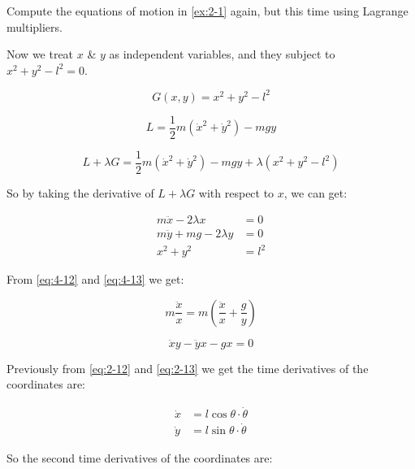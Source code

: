 \begin{example}
    Compute the equations of motion in \ref{ex:2-1} again, but this time using Lagrange multipliers.
\end{example}

Now we treat $x$ \& $y$ as independent variables, and they subject to $x^2+y^2-l^2=0$.
    
\begin{equation}
    G\left(x, y\right) = x^2 + y^2 - l^2
\end{equation}

\begin{equation}
    L = \frac{1}{2} m \left(\dot{x} ^ 2 + \dot{y} ^ 2\right) - mgy
\end{equation}

\begin{equation}
    L + \lambda G = \frac{1}{2} m \left(\dot{x} ^ 2 + \dot{y} ^ 2\right) - mgy + \lambda \left(x^2 + y^2 - l^2\right)
\end{equation}

So by taking the derivative of $L + \lambda G$ with respect to $x$, we can get:

\begin{align}
    \label{eq:4-12}
    m \ddot{x} - 2 \lambda x &= 0 \\
    \label{eq:4-13}
    m \ddot{y} + mg - 2 \lambda y &= 0 \\
    x ^ 2 + y ^ 2 &= l ^ 2
\end{align}

From \ref{eq:4-12} and \ref{eq:4-13} we get:

\begin{equation}
    m \frac{\ddot{x}}{x} = m \left(\frac{\ddot{x}}{x} + \frac{g}{y}\right)
\end{equation}

\begin{equation}
    \label{eq:4-16}
    \ddot{x} y - \ddot{y} x - gx = 0
\end{equation}

Previously from \ref{eq:2-12} and \ref{eq:2-13} we get the time derivatives of the coordinates are:

\begin{align}
    \dot{x} &= l \cos{\theta} \cdot \dot{\theta} \\
    \dot{y} &= l \sin{\theta} \cdot \dot{\theta} 
\end{align}

So the second time derivatives of the coordinates are:

